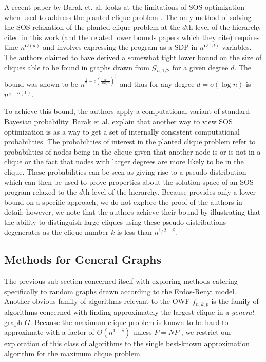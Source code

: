 \documentclass{article}
\theoremstyle{definition}
\begin{document}
A recent paper by Barak et. al. looks at the limitations of SOS optimization when 
used to address the planted clique problem \cite{SOS2016}.  The only method of solving the 
SOS relaxation of the planted clique problem at the $d$th level of the hierarchy 
cited in this work (and the related lower bounds papers which they cite) requires time 
$n^{O(d)}$ and involves expressing the program as a SDP in $n^{O(d)}$ variables. The authors claimed to have derived a somewhat tight lower bound on the size of cliques able to be found in 
graphs drawn from $\mathcal{G}_{n,1/2}$ for a given degree $d$. The bound was shown to be $n^{\frac{1}{2}-c(\frac{d}{\log n})^{\frac{1}{2}}}$ and thus for any degree $d = o(\log n)$ is $n^{\frac{1}{2} - o(1)}$.  

To achieve this bound, the authors apply a computational variant of standard Bayesian probability. Barak et al. explain that another way to view SOS optimization is as a way to get a set of internally consistent computational probabilities. The probabilities of interest in the planted clique problem refer to probabilities of nodes being in the clique given that another node is or is not in a clique or the fact that nodes with larger degrees are more likely to be in the clique. These probabilities can be seen as giving rise to a pseudo-distribution which can then be used to prove properties about the solution space of an 
SOS program relaxed to the $d$th level of the hierarchy.  Because 
\cite{SOS2016} provides only a lower bound on a specific approach, we do not explore the proof 
of the authors in detail; however, we note that the authors achieve their bound by illustrating 
that the ability to distinguish large cliques using these pseudo-distributions degenerates 
as the clique number $k$ is less than $n^{1/2-\delta}$.

\subsection{Methods for General Graphs}

The previous sub-section concerned itself with exploring methods catering specifically to random graphs 
drawn according to the Erdos-Renyi model.  Another obvious family of algorithms relevant to the OWF $f_{n,k,p}$
is the family of algorithms concerned with finding approximately the largest clique in a \textit{general} graph 
$G$.  Because the maximum clique problem is known to be hard to approximate with a factor of $O(n^{1-\delta})$ unless
$P = NP$ \cite{HardToApprox}, we restrict our exploration of this class of algorithms to the single best-known 
approximation algorithm for the maximum clique problem\cite{BestKnown}.
\end{document}

